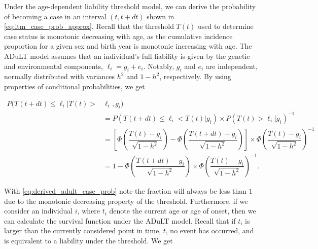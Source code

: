 %
Under the age-dependent liability threshold model, we can derive the probability of becoming a case in an interval $ (t, t+ dt) $ shown in \cref{eq:ltm_case_prob_approx}. Recall that the threshold $ T(t) $ used to determine case status is monotonic decreasing with age, as the cumulative incidence proportion for a given sex and birth year is monotonic increasing with age. The ADuLT model assumes that an individual's full liability is given by the genetic and environmental components, $ \ell_i = g_i + e_i $. Notably, $ g_i $ and $ e_i $ are independent, normally distributed with variances $ h^2 $ and $ 1 - h^2 $, respectively. By using properties of conditional probabilities, we get


\begin{align}
	P(T(t + dt) \leq \ell_i | T(t) >& \ell_i, g_i)  \\
	&=P(T(t + dt) \leq \ell_i < T(t)|g_i) \times P(T(t) > \ell_i | g_i)^{-1}  \\
	&=
	\left[\Phi\left( \dfrac{T(t) - g_i}{\sqrt{1 - h^2}}\right) - \Phi\left( \dfrac{T(t + dt) - g_i}{\sqrt{1 - h^2}}\right)\right] \times
	\Phi \left( \dfrac{T(t) - g_i}{\sqrt{1 - h^2}}\right)^{-1} \\
	&=
	1 - \Phi\left( \dfrac{T(t + dt) - g_i}{\sqrt{1 - h^2}}\right) \times \Phi\left( \dfrac{T(t) - g_i}{\sqrt{1 - h^2}}\right)^{-1} \label{eq:derived_adult_case_prob}.
\end{align}

With \cref{eq:derived_adult_case_prob} note the fraction will always be less than $ 1 $ due to the monotonic decreasing property of the threshold. Furthermore, if we consider an individual $ i $, where $ t_i $ denote the current age or age of onset, then we can calculate the survival function under the ADuLT model. Recall that if $ t_i $ is larger than the currently considered point in time, $ t $, no event has occurred, and is equivalent to a liability under the threshold. We get


